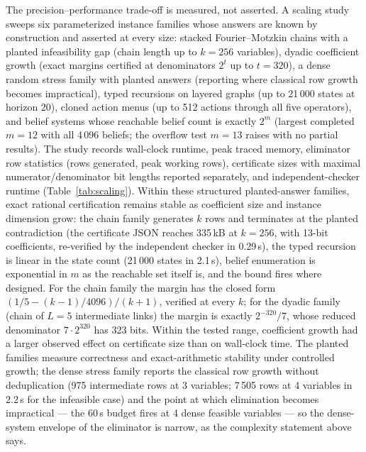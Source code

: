 \documentclass[11pt]{article}
\begin{document}
The precision--performance trade-off is measured, not asserted. A scaling
study sweeps six parameterized instance families whose answers are known
by construction and asserted at every size: stacked Fourier--Motzkin
chains with a planted infeasibility gap (chain length up to $k = 256$
variables), dyadic coefficient growth (exact margins certified at
denominators $2^{t}$ up to $t = 320$), a dense random stress family with
planted answers (reporting where classical row growth becomes
impractical), typed recursions on layered graphs (up to 21\,000 states at
horizon 20), cloned action menus (up to 512 actions through all five
operators), and belief systems whose reachable belief count is exactly
$2^{m}$ (largest completed $m = 12$ with all 4\,096 beliefs; the
overflow test $m = 13$ raises with no partial results). The study records
wall-clock runtime, peak traced memory, eliminator row statistics (rows
generated, peak working rows), certificate sizes with maximal
numerator/denominator bit lengths reported separately, and
independent-checker runtime (Table~\ref{tab:scaling}). Within these
structured planted-answer families, exact rational certification remains
stable as coefficient size and instance dimension grow: the chain family
generates $k$ rows and terminates at the planted contradiction (the
certificate JSON reaches 335\,kB at $k = 256$, with 13-bit coefficients,
re-verified by the independent checker in 0.29\,s), the typed recursion
is linear in the state count (21\,000 states in 2.1\,s), belief
enumeration is exponential in $m$ as the reachable set itself is, and the
bound fires where designed. For the chain family the margin has the
closed form $(1/5 - (k-1)/4096)/(k+1)$, verified at every $k$; for the
dyadic family (chain of $L = 5$ intermediate links) the margin is
exactly $2^{-320}/7$, whose reduced denominator $7 \cdot 2^{320}$ has
323 bits. Within the tested range, coefficient growth had a larger
observed effect on certificate size than on wall-clock time. The planted
families measure correctness and exact-arithmetic stability under
controlled growth; the dense stress family reports the classical row
growth without deduplication (975 intermediate rows at 3 variables;
7\,505 rows at 4 variables in 2.2\,s for the infeasible case) and the
point at which elimination becomes impractical --- the 60\,s budget
fires at 4 dense feasible variables --- so the dense-system envelope of
the eliminator is narrow, as the complexity statement above says.
\end{document}
